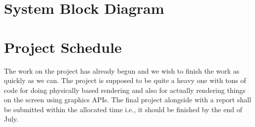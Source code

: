\documentclass[a4paper, 12pt]{article}
\begin{document}
\section{System Block Diagram}


\section{Project Schedule}
The work on the project has already begun and we 
wish to finish the work as quickly as we can. 
The project is supposed to be quite a heavy one with 
tons of code for doing physically based rendering 
and also for actually rendering things on the 
screen using graphics APIs. The final project alongside
with a report shall be submitted within the 
allocated time i.e., it should be finished by the end of July.

\newpage
\printbibliography
\end{document}
